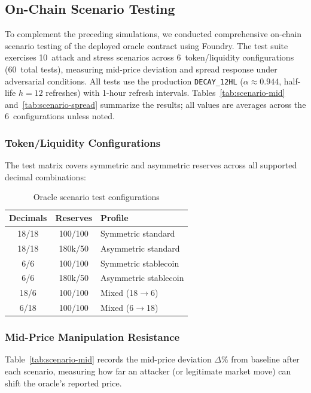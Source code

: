 \documentclass[10pt,a4paper,twocolumn]{article}
\theoremstyle{definition}
\theoremstyle{plain}
\theoremstyle{remark}
\begin{document}
\subsection{On-Chain Scenario Testing}
\label{subsec:oracle-scenarios}

To complement the preceding simulations, we conducted comprehensive on-chain scenario testing of the deployed oracle contract using Foundry. The test suite exercises 10~attack and stress scenarios across 6~token/liquidity configurations (60~total tests), measuring mid-price deviation and spread response under adversarial conditions. All tests use the production \texttt{DECAY\_12HL} ($\alpha \approx 0.944$, half-life $h{=}12$ refreshes) with 1-hour refresh intervals. Tables~\ref{tab:scenario-mid} and~\ref{tab:scenario-spread} summarize the results; all values are averages across the 6~configurations unless noted.

\subsubsection{Token/Liquidity Configurations}

The test matrix covers symmetric and asymmetric reserves across all supported decimal combinations:

\begin{table}[H]
\centering
\small
\caption{Oracle scenario test configurations}
\label{tab:scenario-configs}
\begin{tabularx}{0.95\columnwidth}{@{}c c X@{}}
\toprule
Decimals & Reserves & Profile \\
\midrule
18/18 & 100/100 & Symmetric standard \\
18/18 & 180k/50 & Asymmetric standard \\
6/6 & 100/100 & Symmetric stablecoin \\
6/6 & 180k/50 & Asymmetric stablecoin \\
18/6 & 100/100 & Mixed (18$\to$6) \\
6/18 & 100/100 & Mixed (6$\to$18) \\
\bottomrule
\end{tabularx}
\end{table}

\subsubsection{Mid-Price Manipulation Resistance}

Table~\ref{tab:scenario-mid} records the mid-price deviation $\Delta\%$ from baseline after each scenario, measuring how far an attacker (or legitimate market move) can shift the oracle's reported price.
\end{document}
